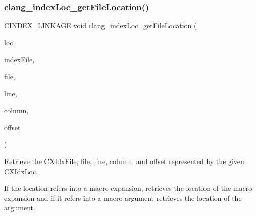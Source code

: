 \subsubsection{\texorpdfstring{clang\+\_\+index\+Loc\+\_\+get\+File\+Location()}{clang\_indexLoc\_getFileLocation()}}
{\footnotesize\ttfamily C\+I\+N\+D\+E\+X\+\_\+\+L\+I\+N\+K\+A\+GE void clang\+\_\+index\+Loc\+\_\+get\+File\+Location (\begin{DoxyParamCaption}\item[{\mbox{\hyperlink{structCXIdxLoc}{C\+X\+Idx\+Loc}}}]{loc,  }\item[{\mbox{\hyperlink{group__CINDEX__HIGH_ga6fd9c59c0b0a0a21622e5bcfc08156cc}{C\+X\+Idx\+Client\+File}} $\ast$}]{index\+File,  }\item[{\mbox{\hyperlink{group__CINDEX__FILES_gacfcea9c1239c916597e2e5b3e109215a}{C\+X\+File}} $\ast$}]{file,  }\item[{unsigned $\ast$}]{line,  }\item[{unsigned $\ast$}]{column,  }\item[{unsigned $\ast$}]{offset }\end{DoxyParamCaption})}



Retrieve the C\+X\+Idx\+File, file, line, column, and offset represented by the given \mbox{\hyperlink{structCXIdxLoc}{C\+X\+Idx\+Loc}}. 

If the location refers into a macro expansion, retrieves the location of the macro expansion and if it refers into a macro argument retrieves the location of the argument. \mbox{\label{group__CINDEX__HIGH_gaa5c2ad8979779c401b91110d444e2be6}} 

